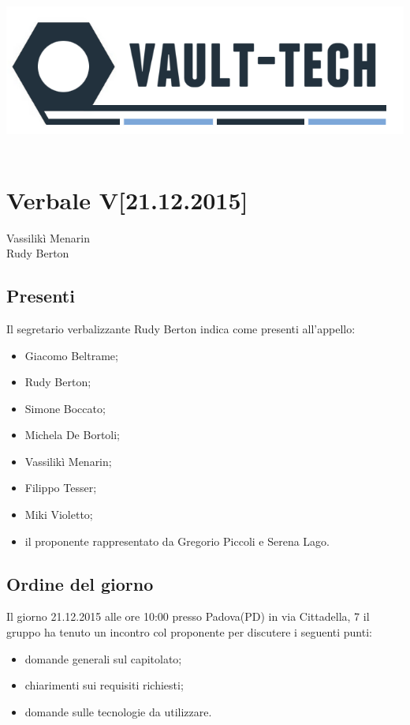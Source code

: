 \documentclass[a4paper]{article}
\def\DATA{21.12.2015}
\def\ORA{10:00}
\def\CITTA{Padova}
\def\PROVINCIA{PD}
\def\VIA{via Cittadella, 7}
\def\SEGRETARIO{Rudy Berton}
\def\RESPONSABILE{Vassilikì Menarin}
\begin{document}
\begin{center}
\includegraphics[scale=0.5]{Img/logo.png}\\
\vspace{1cm}
{\Huge \PROGETTO}\\
\vspace{1cm}
\section*{Verbale V[\DATA]}
\end{center}

%
%
 \RESPONSABILE
\\  \SEGRETARIO
\\
\subsection*{Presenti}
Il segretario verbalizzante \SEGRETARIO{} indica come presenti all'appello:
\begin{itemize}
\item Giacomo Beltrame;
\item Rudy Berton;
\item Simone Boccato;
\item Michela De Bortoli;
\item Vassilikì Menarin;
\item Filippo Tesser;
\item Miki Violetto;
\item il proponente rappresentato da Gregorio Piccoli e Serena Lago.
\end{itemize}

\subsection*{Ordine del giorno}
Il giorno \DATA{} alle ore \ORA{} presso \CITTA (\PROVINCIA) in \VIA{} il gruppo \AUTORE{} ha tenuto un incontro col proponente per discutere i seguenti punti:
\begin{itemize}
\item domande generali sul capitolato;
\item chiarimenti sui requisiti richiesti;
\item domande sulle tecnologie da utilizzare.
\end{itemize}
\end{document}
